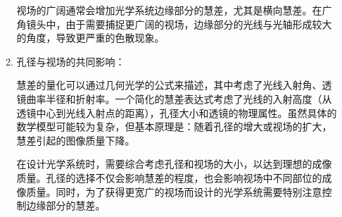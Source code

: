 \documentclass[dvipsnames, svgnames,a4paper,11pt]{article}
\begin{document}
\begin{enumerate}
\begin{enumerate}
			视场的广阔通常会增加光学系统边缘部分的慧差，尤其是横向慧差。在广角镜头中，由于需要捕捉更广阔的视场，边缘部分的光线与光轴形成较大的角度，导致更严重的色散现象。
			\item 孔径与视场的共同影响：
			
			慧差的量化可以通过几何光学的公式来描述，其中考虑了光线入射角、透镜曲率半径和折射率。一个简化的慧差表达式考虑了光线的入射高度（从透镜中心到光线入射点的距离），孔径大小和透镜的物理属性。虽然具体的数学模型可能较为复杂，但基本原理是：随着孔径的增大或视场的扩大，慧差引起的图像质量下降。
			
			在设计光学系统时，需要综合考虑孔径和视场的大小，以达到理想的成像质量。孔径的选择不仅会影响慧差的程度，也会影响视场中不同部位的成像质量。同时，为了获得更宽广的视场而设计的光学系统需要特别注意控制边缘部分的慧差。
		\end{enumerate}
	\end{enumerate}
	
\end{document}
